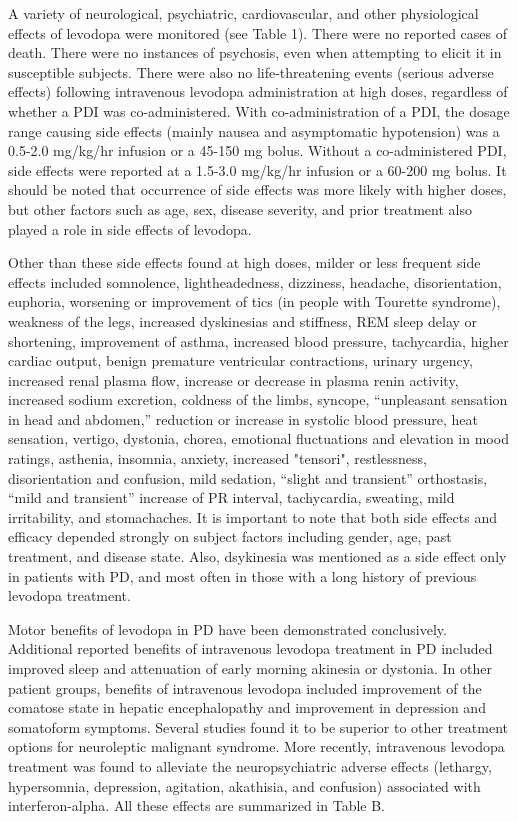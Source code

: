 A variety of neurological, psychiatric, cardiovascular, and other physiological effects of levodopa  were monitored (see Table 1). There were no reported cases of death.  There were no instances of psychosis, even when attempting to elicit it in susceptible subjects\cite{9748031}.  There were also no life-threatening events (serious adverse effects) following intravenous levodopa administration at high doses, regardless of whether a PDI was co-administered.  With co-administration of a PDI, the dosage range causing side effects (mainly nausea and asymptomatic hypotension) was a 0.5-2.0 mg/kg/hr infusion or a 45-150 mg bolus.  Without a co-administered PDI, side effects were reported at a 1.5-3.0 mg/kg/hr infusion or a 60-200 mg bolus. It should be noted that occurrence of side effects was more likely with higher doses, but other factors such as age, sex, disease severity, and prior treatment also played a role in side effects of levodopa.  

Other than these side effects found at high doses, milder or less frequent side effects included somnolence, lightheadedness, dizziness, headache, disorientation, euphoria, worsening or improvement of tics (in people with Tourette syndrome), weakness of the legs, increased dyskinesias and stiffness, REM sleep delay or shortening, improvement of asthma, increased blood pressure, tachycardia, higher cardiac output, benign premature ventricular contractions, urinary urgency, increased renal plasma flow, increase or decrease in plasma renin activity, increased sodium excretion, coldness of the limbs, syncope, “unpleasant sensation in head and abdomen,” reduction or increase in systolic blood pressure, heat sensation, vertigo, dystonia, chorea, emotional fluctuations and elevation in mood ratings, asthenia, insomnia, anxiety, increased "tensori", restlessness, disorientation and confusion, mild sedation, “slight and transient” orthostasis, “mild and transient” increase of PR interval, tachycardia, sweating, mild irritability, and stomachaches.  It is important to note that both side effects and efficacy depended strongly on subject factors including gender, age, past treatment, and disease state.  Also, dsykinesia was mentioned as a side effect only in patients with PD, and most often in those with a long history of previous levodopa treatment.

Motor benefits of levodopa in PD have been demonstrated conclusively. Additional reported benefits of intravenous levodopa treatment in PD included improved sleep\cite{6722513} and attenuation of early morning akinesia or dystonia\cite{3601092}.  In other patient groups, benefits of intravenous levodopa included improvement of the comatose state in hepatic encephalopathy\cite{4544184} and improvement in depression and somatoform symptoms\cite{5898634}.  Several studies found it to be superior to other treatment options for neuroleptic malignant syndrome\cite{9099421}.  More recently, intravenous levodopa treatment was found to alleviate the neuropsychiatric adverse effects (lethargy, hypersomnia, depression, agitation, akathisia, and confusion) associated with interferon-alpha\cite{10682234}. All these effects are summarized in Table B.